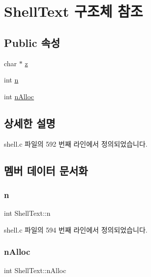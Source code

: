\hypertarget{struct_shell_text}{}\section{Shell\+Text 구조체 참조}
\label{struct_shell_text}
\subsection*{Public 속성}
\begin{DoxyCompactItemize}
\item 
char $\ast$ \hyperlink{struct_shell_text_ad7acc0c56c1066a865700d2f472b7069}{z}
\item 
int \hyperlink{struct_shell_text_a8b8addc0530be548b9f118dc90ef6d30}{n}
\item 
int \hyperlink{struct_shell_text_a44c20e5561668de289aa47e7d65e8ead}{n\+Alloc}
\end{DoxyCompactItemize}


\subsection{상세한 설명}


shell.\+c 파일의 592 번째 라인에서 정의되었습니다.



\subsection{멤버 데이터 문서화}
\mbox{\label{struct_shell_text_a8b8addc0530be548b9f118dc90ef6d30}} 
\subsubsection{\texorpdfstring{n}{n}}
{\footnotesize\ttfamily int Shell\+Text\+::n}



shell.\+c 파일의 594 번째 라인에서 정의되었습니다.

\mbox{\label{struct_shell_text_a44c20e5561668de289aa47e7d65e8ead}} 
\subsubsection{\texorpdfstring{n\+Alloc}{nAlloc}}
{\footnotesize\ttfamily int Shell\+Text\+::n\+Alloc}



